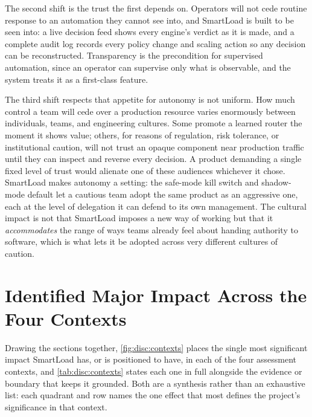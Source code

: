 The second shift is the trust the first depends on. Operators will not cede routine
response to an automation they cannot see into, and SmartLoad is built to be seen into:
a live decision feed shows every engine's verdict as it is made, and a complete audit log
records every policy change and scaling action so any decision can be reconstructed.
Transparency is the precondition for supervised automation, since an operator can
supervise only what is observable, and the system treats it as a first-class feature.

The third shift respects that appetite for autonomy is not uniform. How much control a
team will cede over a production resource varies enormously between individuals, teams,
and engineering cultures. Some promote a learned router the moment it shows value;
others, for reasons of regulation, risk tolerance, or institutional caution, will not
trust an opaque component near production traffic until they can inspect and reverse
every decision. A product demanding a single fixed level of trust would alienate one of
these audiences whichever it chose. SmartLoad makes autonomy a setting: the safe-mode
kill switch and shadow-mode default let a cautious team adopt the same product as an
aggressive one, each at the level of delegation it can defend to its own management. The
cultural impact is not that SmartLoad imposes a new way of working but that it
\emph{accommodates} the range of ways teams already feel about handing authority to
software, which is what lets it be adopted across very different cultures of caution.

\section{Identified Major Impact Across the Four Contexts}
\label{disc:synthesis}

Drawing the sections together, \cref{fig:disc:contexts} places the single most
significant impact SmartLoad has, or is positioned to have, in each of the four
assessment contexts, and \cref{tab:disc:contexts} states each one in full alongside the
evidence or boundary that keeps it grounded. Both are a synthesis rather than an
exhaustive list: each quadrant and row names the one effect that most defines the
project's significance in that context.

